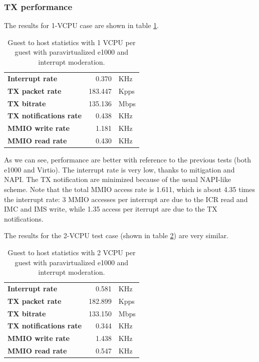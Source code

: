 \subsubsection{TX performance}
The results for 1-VCPU case are shown in table \ref{tab:e1000-par-tx-g2h1vcpu}.
\begin{table}
\begin{center}
\begin{tabular}{lrl}
\toprule
\textbf{Interrupt rate} & 0.370 & KHz\\
\textbf{TX packet rate} & 183.447 & Kpps\\
\textbf{TX bitrate} & 135.136 & Mbps\\
\textbf{TX notifications rate} & 0.438 & KHz\\
\textbf{MMIO write rate} & 1.181 & KHz\\
\textbf{MMIO read rate} & 0.430 & KHz\\
\bottomrule
\end{tabular}
\end{center}
\caption{Guest to host statistics with 1 VCPU per guest with paravirtualized e1000 and interrupt moderation.}
\label{tab:e1000-par-tx-g2h1vcpu}
\end{table}

As we can see, performance are better with reference to the previous tests (both e1000 and Virtio). The interrupt rate is very low,
thanks to mitigation and NAPI. The TX notification are minimized because of the usual NAPI-like scheme.
Note that the total MMIO access rate is 1.611, which is about 4.35 times the interrupt rate: 3 MMIO accesses per interrupt are due
to the ICR read and IMC and IMS write, while 1.35 access per iterrupt are due to the TX notifications.

\vspace{0.5cm}

The results for the 2-VCPU test case (shown in table \ref{tab:e1000-par-tx-g2h2vcpu}) are very similar.
\begin{table}
\begin{center}
\begin{tabular}{lrl}
\toprule
\textbf{Interrupt rate} & 0.581 & KHz\\
\textbf{TX packet rate} & 182.899 & Kpps\\
\textbf{TX bitrate} & 133.150 & Mbps\\
\textbf{TX notifications rate} & 0.344 & KHz\\
\textbf{MMIO write rate} & 1.438 & KHz\\
\textbf{MMIO read rate} & 0.547 & KHz\\
\bottomrule
\end{tabular}
\end{center}
\caption{Guest to host statistics with 2 VCPU per guest with paravirtualized e1000 and interrupt moderation.}
\label{tab:e1000-par-tx-g2h2vcpu}
\end{table}


